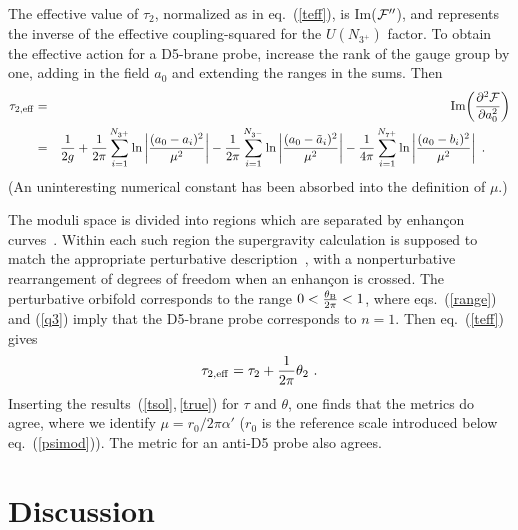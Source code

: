 \documentclass[a4paper,12pt]{article}
\renewcommand{\=}[1]{\bar{#1}}
\newcommand{\sect}[1]{\section{#1}\setcounter{equation}{0}}
\begin{document}
The effective value of $\tau_2$, normalized as in eq.~(\ref{teff}),
is Im(${\cal F}''$), and represents  the inverse of the effective
coupling-squared for  the
$U(N_{3^+})$ factor.  To obtain the effective action for a D5-brane probe,
increase the rank of the gauge group by one, adding in the field $a_0$ and
extending the ranges in the sums. Then
\begin{eqnarray}
\tau_{2,\rm eff} &=& {\rm Im}\biggl( \frac{\partial^2 {\cal F}}{\partial a_0^2}
\biggr) \nonumber\\
&=& \frac{1}{2g} + \frac{1}{2\pi} \sum_{i=1}^{N_{3^+}}
\ln \left|\frac{(a_0-a_i)^2}{\mu^2}\right| - \frac{1}{2\pi} \sum_{i=1}^{N_{3^-}}
\ln \left|\frac{(a_0-\tilde a_i)^2}{\mu^2}\right|  - \frac{1}{4\pi} 
\sum_{i=1}^{N_{7^+}}
\ln \left|\frac{(a_0-b_i)^2}{\mu^2}\right|\ .\qquad
\end{eqnarray}
(An uninteresting numerical constant has been absorbed into the definition of
$\mu$.)

The moduli space is divided into regions which are separated by enhan\c con
curves~\cite{enhan,n2me}.  Within each such region the supergravity calculation is
supposed to match the appropriate perturbative description~\cite{enhan2}, with a
nonperturbative rearrangement of degrees of freedom when an enhan\c con is
crossed.  The perturbative orbifold corresponds to the range $0 < 
\frac{\theta_{\rm
B}}{2\pi} < 1$, where eqs.~(\ref{range}) and (\ref{q3}) imply that the D5-brane 
probe corresponds to
$n=1$.  Then eq.~(\ref{teff}) gives
\begin{equation}
\tau_{2,\rm eff} = \tau_2 + \frac{1}{2\pi}
\theta_2\ . \label{teff2}
\end{equation}
Inserting the results~(\ref{tsol},\,\ref{true}) for $\tau$ and
$\theta$, one finds that the metrics do agree, where we identify
$\mu = r_0/2\pi\alpha'$ ($r_0$ is the reference scale introduced below
eq.~(\ref{psimod})).
The metric for an anti-D5 probe also agrees.

\sect{Discussion}
\end{document}
